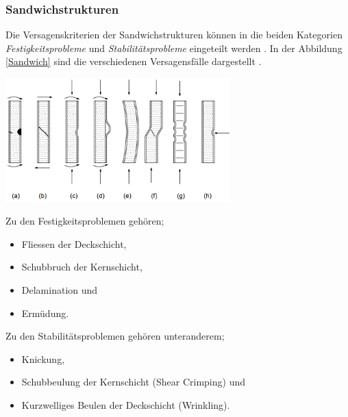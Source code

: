   \subsubsection{Sandwichstrukturen}
  Die Versagenskriterien der Sandwichstrukturen können in die beiden Kategorien \emph{Festigkeitsprobleme} und \emph{Stabilitätsprobleme} eingeteilt werden \cite{ETH}. In der Abbildung \ref{Sandwich} sind die verschiedenen Versagensfälle dargestellt \cite{Sandwich}.

  \begin{center}
    \includegraphics[width=0.65\textwidth]{04_Figures/Sandwich.png}
    \label{Sandwich}
  \end{center}

  Zu den Festigkeitsproblemen gehören;
  \begin{itemize}
    \item Fliessen der Deckschicht,
    \item Schubbruch der Kernschicht,
    \item Delamination und
    \item Ermüdung.
  \end{itemize}

  Zu den Stabilitätsproblemen gehören unteranderem;
  \begin{itemize}
    \item Knickung,
    \item Schubbeulung der Kernschicht (Shear Crimping) und
    \item Kurzwelliges Beulen der Deckschicht (Wrinkling).\\
  \end{itemize}

